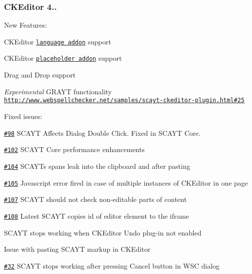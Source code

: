 \subsubsection*{C\+K\+Editor 4..}

New Features\+:
\begin{DoxyItemize}
\item C\+K\+Editor \href{http://ckeditor.com/addon/language}{\tt language addon} support
\item C\+K\+Editor \href{http://ckeditor.com/addon/placeholder}{\tt placeholder addon} support
\item Drag and Drop support
\item {\itshape Experimental} G\+R\+A\+YT functionality \href{http://www.webspellchecker.net/samples/scayt-ckeditor-plugin.html#25}{\tt http\+://www.\+webspellchecker.\+net/samples/scayt-\/ckeditor-\/plugin.\+html\#25}
\end{DoxyItemize}

Fixed issues\+:
\begin{DoxyItemize}
\item \href{https://github.com/WebSpellChecker/ckeditor-plugin-scayt/issues/98}{\tt \#98} S\+C\+A\+YT Affects Dialog Double Click. Fixed in S\+C\+A\+YT Core.
\item \href{https://github.com/WebSpellChecker/ckeditor-plugin-scayt/issues/102}{\tt \#102} S\+C\+A\+YT Core performance enhancements
\item \href{https://github.com/WebSpellChecker/ckeditor-plugin-scayt/issues/104}{\tt \#104} S\+C\+A\+YT\textquotesingle{}s spans leak into the clipboard and after pasting
\item \href{https://github.com/WebSpellChecker/ckeditor-plugin-scayt/issues/105}{\tt \#105} Javascript error fired in case of multiple instances of C\+K\+Editor in one page
\item \href{https://github.com/WebSpellChecker/ckeditor-plugin-scayt/issues/107}{\tt \#107} S\+C\+A\+YT should not check non-\/editable parts of content
\item \href{https://github.com/WebSpellChecker/ckeditor-plugin-scayt/issues/108}{\tt \#108} Latest S\+C\+A\+YT copies id of editor element to the iframe
\item S\+C\+A\+YT stops working when C\+K\+Editor Undo plug-\/in not enabled
\item Issue with pasting S\+C\+A\+YT markup in C\+K\+Editor
\item \href{https://github.com/WebSpellChecker/ckeditor-plugin-wsc/issues/32}{\tt \#32} S\+C\+A\+YT stops working after pressing Cancel button in W\+SC dialog 
\end{DoxyItemize}